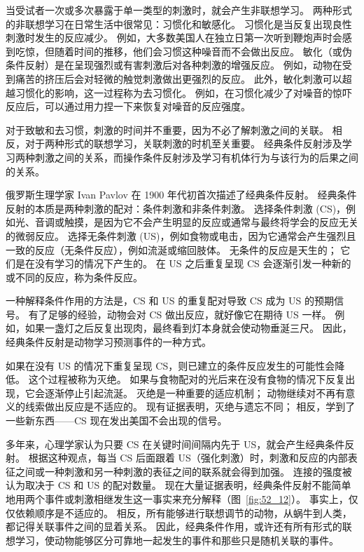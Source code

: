 当受试者一次或多次暴露于单一类型的刺激时，就会产生非联想学习。
两种形式的非联想学习在日常生活中很常见：习惯化和敏感化。
习惯化是当反复出现良性刺激时发生的反应减少。
例如，大多数美国人在独立日第一次听到鞭炮声时会感到吃惊，但随着时间的推移，他们会习惯这种噪音而不会做出反应。
敏化（或伪条件反射）是在呈现强烈或有害刺激后对各种刺激的增强反应。
例如，动物在受到痛苦的挤压后会对轻微的触觉刺激做出更强烈的反应。
此外，敏化刺激可以超越习惯化的影响，这一过程称为去习惯化。
例如，在习惯化减少了对噪音的惊吓反应后，可以通过用力捏一下来恢复对噪音的反应强度。


对于致敏和去习惯，刺激的时间并不重要，因为不必了解刺激之间的关联。
相反，对于两种形式的联想学习，关联刺激的时机至关重要。
经典条件反射涉及学习两种刺激之间的关系，而操作条件反射涉及学习有机体行为与该行为的后果之间的关系。


俄罗斯生理学家 Ivan Pavlov 在 1900 年代初首次描述了经典条件反射。
经典条件反射的本质是两种刺激的配对：条件刺激和非条件刺激。
选择条件刺激 (CS)，例如光、音调或触摸，是因为它不会产生明显的反应或通常与最终将学会的反应无关的微弱反应。
选择无条件刺激 (US)，例如食物或电击，因为它通常会产生强烈且一致的反应（无条件反应），例如流涎或缩回肢体。
无条件的反应是天生的；
它们是在没有学习的情况下产生的。
在 US 之后重复呈现 CS 会逐渐引发一种新的或不同的反应，称为条件反应。


一种解释条件作用的方法是，CS 和 US 的重复配对导致 CS 成为 US 的预期信号。
有了足够的经验，动物会对 CS 做出反应，就好像它在期待 US 一样。
例如，如果一盏灯之后反复出现肉，最终看到灯本身就会使动物垂涎三尺。
因此，经典条件反射是动物学习预测事件的一种方式。


如果在没有 US 的情况下重复呈现 CS，则已建立的条件反应发生的可能性会降低。
这个过程被称为灭绝。
如果与食物配对的光后来在没有食物的情况下反复出现，它会逐渐停止引起流涎。
灭绝是一种重要的适应机制；
动物继续对不再有意义的线索做出反应是不适应的。
现有证据表明，灭绝与遗忘不同；
相反，学到了一些新东西——CS 现在发出美国不会出现的信号。


多年来，心理学家认为只要 CS 在关键时间间隔内先于 US，就会产生经典条件反射。
根据这种观点，每当 CS 后面跟着 US（强化刺激）时，刺激和反应的内部表征之间或一种刺激和另一种刺激的表征之间的联系就会得到加强。
连接的强度被认为取决于 CS 和 US 的配对数量。
现在大量证据表明，经典条件反射不能简单地用两个事件或刺激相继发生这一事实来充分解释（图~\ref{fig:52_12}）。
事实上，仅仅依赖顺序是不适应的。
相反，所有能够进行联想调节的动物，从蜗牛到人类，都记得关联事件之间的显着关系。
因此，经典条件作用，或许还有所有形式的联想学习，使动物能够区分可靠地一起发生的事件和那些只是随机关联的事件。


